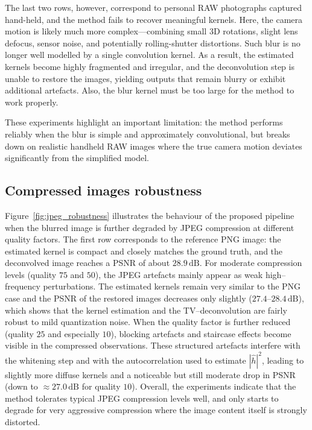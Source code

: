 \documentclass[a4paper,11pt]{article}
\begin{document}
The last two rows, however, correspond to personal RAW photographs captured hand-held, and the method fails to recover meaningful kernels. Here, the camera motion is likely much more complex—combining small 3D rotations, slight lens defocus, sensor noise, and potentially rolling-shutter distortions. Such blur is no longer well modelled by a single convolution kernel. As a result, the estimated kernels become highly fragmented and irregular, and the deconvolution step is unable to restore the images, yielding outputs that remain blurry or exhibit additional artefacts.
Also, the blur kernel must be too large for the method to work properly.

These experiments highlight an important limitation: the method performs reliably when the blur is simple and approximately convolutional, but breaks down on realistic handheld RAW images where the true camera motion deviates significantly from the simplified model.

\subsection{Compressed images robustness}

Figure~\ref{fig:jpeg_robustness} illustrates the behaviour of the proposed
pipeline when the blurred image is further degraded by JPEG compression at
different quality factors. The first row corresponds to the reference PNG image:
the estimated kernel is compact and closely matches the ground truth, and the
deconvolved image reaches a PSNR of about $28.9\,\mathrm{dB}$. For moderate
compression levels (quality $75$ and $50$), the JPEG artefacts mainly appear as
weak high–frequency perturbations. The estimated kernels remain very similar to
the PNG case and the PSNR of the restored images decreases only slightly
($27.4$–$28.4\,\mathrm{dB}$), which shows that the kernel estimation and the
TV–deconvolution are fairly robust to mild quantization noise. When the quality
factor is further reduced (quality $25$ and especially $10$), blocking artefacts
and staircase effects become visible in the compressed observations. These
structured artefacts interfere with the whitening step and with the
autocorrelation used to estimate $|\hat h|^2$, leading to slightly more
diffuse kernels and a noticeable but still moderate drop in PSNR (down to
$\approx 27.0\,\mathrm{dB}$ for quality $10$). Overall, the experiments
indicate that the method tolerates typical JPEG compression levels well, and
only starts to degrade for very aggressive compression where the image content
itself is strongly distorted.
\end{document}
